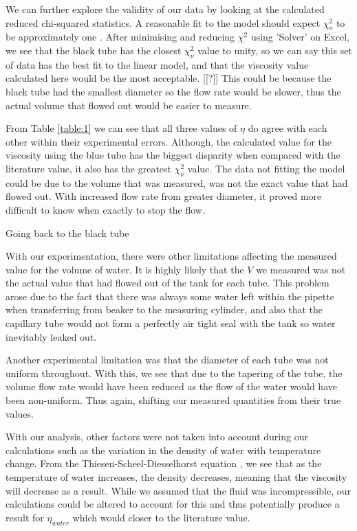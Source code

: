 \documentclass[twocolumn]{revtex4}
\begin{document}
We can further explore the validity of our data by looking at the calculated reduced chi-squared statistics. A reasonable fit to the model should expect $\chi^2_{\nu}$ to be approximately one \cite{hughesandhayes}. After minimising and reducing $\chi^2$ using 'Solver' on Excel, we see that the black tube has the closest $\chi^2_{\nu}$ value to unity, so we can say this set of data has the best fit to the linear model, and that the viscosity value calculated here would be the most acceptable. [[?]] This could be because the black tube had the smallest diameter so the flow rate would be slower, thus the actual volume that flowed out would be easier to measure.

From Table \ref{table:1} we can see that all three values of $\eta$ do agree with each other within their experimental errors. Although, the calculated value for the viscosity using the blue tube has the biggest disparity when compared with the literature value, it also has the greatest $\chi^2_{\nu}$ value. The data not fitting the model could be due to the volume that was measured, was not the exact value that had flowed out. With increased flow rate from greater diameter, it proved more difficult to know when exactly to stop the flow. 

Going back to the black tube 

With our experimentation, there were other limitations affecting the measured value for the volume of water. It is highly likely that the $V$ we measured was not the actual value that had flowed out of the tank for each tube. This problem arose due to the fact that there was always some water left within the pipette when transferring from beaker to the measuring cylinder, and also that the capillary tube would not form a perfectly air tight seal with the tank so water inevitably leaked out.

Another experimental limitation was that the diameter of each tube was not uniform throughout. With this, we see that due to the tapering of the tube, the volume flow rate would have been reduced as the flow of the water would have been non-uniform. Thus again, shifting our measured quantities from their true values.

With our analysis, other factors were not taken into account during our calculations such as the variation in the density of water with temperature change. From the Thiesen-Scheel-Diesselhorst equation \cite{dentemp}, we see that as the temperature of water increases, the density decreases, meaning that the viscosity will decrease as a result. While we assumed that the fluid was incompressible, our calculations could be altered to account for this and thus potentially produce a result for $\eta_{water}$ which would closer to the literature value.
\end{document}
